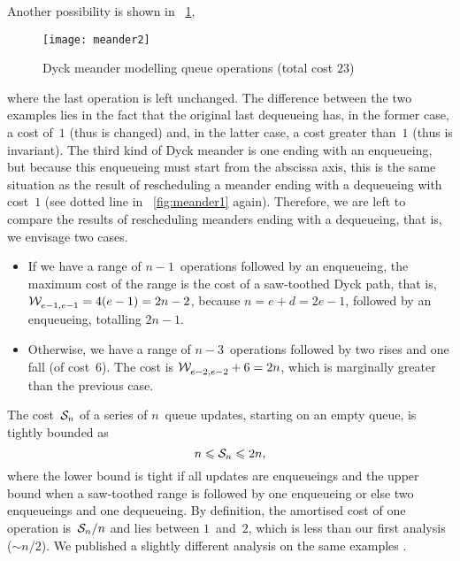 Another possibility is shown in \fig~\ref{fig:meander2},
\begin{figure}[t]
\centering
\texttt{[image: meander2]}
\caption{Dyck meander modelling queue operations (total cost
  \(23\))\label{fig:meander2}}
\end{figure}
where the last operation is left unchanged. The difference between the
two examples lies in the fact that the original last dequeueing has,
in the former case, a cost of~\(1\) (thus is changed) and, in the
latter case, a cost greater than~\(1\) (thus is invariant). The third
kind of Dyck meander is one ending with an enqueueing, but because
this enqueueing must start from the abscissa axis, this is the same
situation as the result of rescheduling a meander ending with a
dequeueing with cost~\(1\) (see dotted line in \fig~\ref{fig:meander1}
again). Therefore, we are left to compare the results of rescheduling
meanders ending with a dequeueing, that is, we envisage two cases.
\begin{itemize}

  \item If we have a range of \(n-1\)~operations followed by an
    enqueueing, the maximum cost of the range is the cost of a
    saw\hyp{}toothed Dyck path, that is,
    \(\mathcal{W}_{e-1,e-1}^{}=4(e-1)=2n-2\), because \(n=e+d=2e-1\), followed by
    an enqueueing, totalling \(2n-1\).

  \item Otherwise, we have a range of \(n-3\)~operations followed by
    two rises and one fall (of cost~\(6\)). The cost is
    \(\mathcal{W}_{e-2,e-2}^{}+6=2n\), which is marginally greater than the
    previous case.

\end{itemize}


The cost~\(\mathcal{S}_{n}\) of a series of \(n\)~queue updates, starting on an
empty queue, is tightly bounded as
\begin{equation*}
n \leqslant \mathcal{S}_{n} \leqslant 2n,
\end{equation*}
where the lower bound is tight if all updates are enqueueings and the
upper bound when a saw\hyp{}toothed range is followed by one
enqueueing or else two enqueueings and one dequeueing. By definition,
the amortised cost of one operation is~\(\mathcal{S}_{n}/n\) and lies between
\(1\)~and~\(2\), which is less than our first analysis (\(\sim
n/2\)). We published a slightly different analysis on the same
examples \citep{Rinderknecht_2011}.

